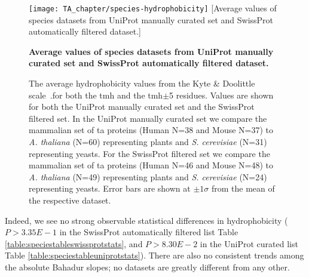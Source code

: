 \begin{figure}[!ht]
\centering
\texttt{[image: TA\_chapter/species-hydrophobicity]}
[Average values of species datasets from UniProt manually curated set and SwissProt automatically filtered dataset.]
{\textbf{Average values of species datasets from UniProt manually curated set and SwissProt automatically filtered dataset.}

The average hydrophobicity values from the Kyte \& Doolittle scale~\cite{Kyte1982}.for both the \gls{tmh} and the \gls{tmh}$\pm$5 residues.
Values are shown for both the UniProt manually curated set and the SwissProt filtered set. In the UniProt manually curated set we compare the mammalian set of \gls{ta} proteins (Human N=38 and Mouse N=37) to \textit{A. thaliana} (N=60) representing plants and \textit{S. cerevisiae} (N=31) representing yeasts. For the SwissProt filtered set we compare the mammalian set of \gls{ta} proteins (Human N=46 and Mouse N=48) to \textit{A. thaliana} (N=49) representing plants  and  \textit{S. cerevisiae} (N=24) representing yeasts.
Error bars are shown at $\pm 1 \sigma$ from the mean of the respective dataset.
}

\label{fig:average_species_hydrophobicity_ta}
\end{figure}

Indeed, we see no strong observable statistical differences in hydrophobicity ($P>3.35E-1$ in the SwissProt automatically filtered list Table \ref{table:speciestableswissprotstats}, and $P>8.30E-2$ in the UniProt curated list Table \ref{table:speciestableuniprotstats}).
There are also no consistent trends among the absolute Bahadur slopes; no datasets are greatly different from any other.

